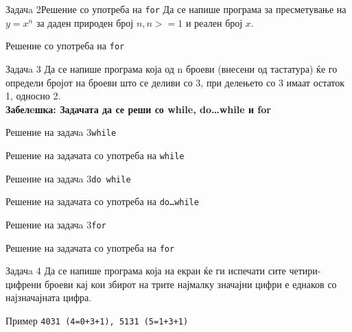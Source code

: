 \begin{frame}[fragile]{Задачa 2}{Решение со употреба на \texttt{for}}
Да се напише програма за пресметување на $y = x^n$ за даден природен број $n,
n>=1$ и реален број $x$.
\pause
\begin{exampleblock}{Решение со употреба на \texttt{for}}

\end{exampleblock}
\end{frame}


\begin{frame}[fragile]{Задачa 3}
Да се напише програма која од n броеви (внесени од тастатура) ќе го определи
бројот на броеви што се деливи со 3, при делењето со 3 имаат остаток 1, односно
2.\\
\textbf{Забелeшка: Задачата да се реши со while, do…while и for}
\end{frame}


\begin{frame}[fragile]{Решение на задачa 3}{\texttt{while}}
\begin{exampleblock}{Решение на задачата со употреба на \texttt{while}}

\end{exampleblock}
\end{frame}


\begin{frame}[fragile]{Решение на задачa 3}{\texttt{do while}}
\begin{exampleblock}{Решение на задачата со употреба на \texttt{do\ldots while}}

\end{exampleblock}
\end{frame}


\begin{frame}[fragile]{Решение на задачa 3}{\texttt{for}}
\begin{exampleblock}{Решение на задачата со употреба на \texttt{for}}

\end{exampleblock}
\end{frame}

\begin{frame}[fragile]{Задачa 4}
Да се напише програма која на екран ќе ги испечати сите четири-цифрени броеви кај кои збирот на трите 
најмалку значајни цифри е еднаков со најзначајната цифра.
\begin{exampleblock}{Пример}
	\texttt{4031 (4=0+3+1), 5131 (5=1+3+1)}
\end{exampleblock}
\end{frame}


